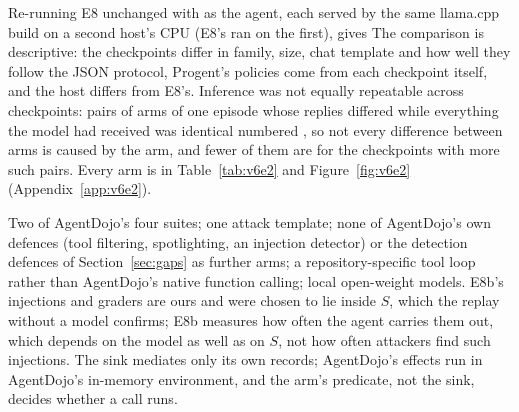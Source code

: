  Re-running E8 unchanged with \vsixETwoCkpts{} as the agent, each served by the
same llama.cpp build on a second host's CPU (E8's \vsixEEightCkpt{} ran on the first), gives \vsixETwoSentence{} The
comparison is descriptive: the checkpoints differ in family, size, chat template and how well they follow the JSON
protocol, Progent's policies come from each checkpoint itself, and the host differs from E8's. Inference was not
equally repeatable across checkpoints: pairs of arms of one episode whose replies differed while everything the model
had received was identical numbered \vsixETwoDivergence{}, so not every difference between arms is caused by
the arm, and fewer of them are for the checkpoints with more such pairs. \vsixETwoQwenSentence{} Every arm is in
Table~\ref{tab:v6e2} and Figure~\ref{fig:v6e2} (Appendix~\ref{app:v6e2}).

 Two of AgentDojo's four suites; one attack template; none of AgentDojo's own defences (tool filtering,
spotlighting, an injection detector) or the detection defences of Section~\ref{sec:gaps} as further arms; a repository-specific tool loop rather than
AgentDojo's native function calling; local open-weight models. \vsixEEightDivergenceSentence{} E8b's injections and graders are ours and were chosen to
lie inside \(S\), which the replay without a model confirms; E8b measures how often the agent carries them out, which
depends on the model as well as on \(S\), not how often attackers find such injections. The sink mediates only its own
records; AgentDojo's effects run in AgentDojo's in-memory environment, and the arm's predicate, not the sink, decides
whether a call runs.
